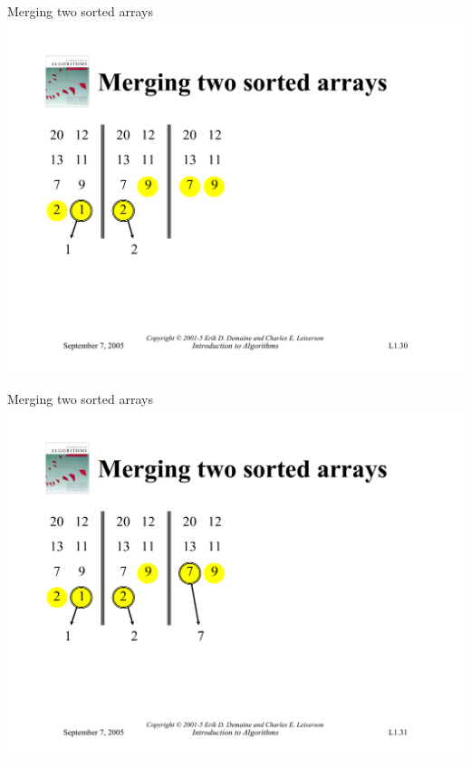 \documentclass{beamer}
\begin{document}
\begin{frame}{Merging two sorted arrays}
    \centering
    \includegraphics[width=\textwidth, trim={1.1cm 6cm 1.1cm 4.95cm}, clip]{pages/lec1_30}
\end{frame}
\begin{frame}{Merging two sorted arrays}
    \centering
    \includegraphics[width=\textwidth, trim={1.1cm 6cm 1.1cm 4.95cm}, clip]{pages/lec1_31}
\end{frame}
\end{document}
